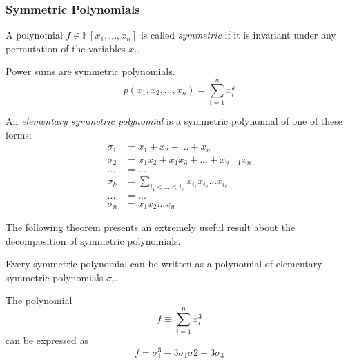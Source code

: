 \documentclass{article}
\begin{document}
    \subsubsection{Symmetric Polynomials}

      \begin{definition}
        A polynomial $f \in \mathbb{F}[x_1, ..., x_n]$ is called \textit{symmetric} if it is invariant under any permutation of the variables $x_i$. 
      \end{definition}

      \begin{example}
        Power sums are symmetric polynomials. 
        \begin{equation}
          p(x_1, x_2, ..., x_n) = \sum_{i=1}^n x_i^k
        \end{equation}
      \end{example}

      \begin{definition}
        An \textit{elementary symmetric polynomial} is a symmetric polynomial of one of these forms: 
        \begin{align*}
          \sigma_1 & = x_1 + x_2 + ... + x_n \\
          \sigma_2 & = x_1 x_2 + x_1 x_3 + ... + x_{n-1} x_n \\
          ... & = ... \\
          \sigma_k & = \sum_{i_1 < ... < i_k} x_{i_1} x_{i_2} ... x_{i_k} \\
          ... & = ... \\
          \sigma_n & = x_1 x_2 ... x_n
        \end{align*}
      \end{definition}

      The following theorem presents an extremely useful result about the decomposition of symmetric polynomials. 

      \begin{theorem}
        Every symmetric polynomial can be written as a polynomial of elementary symmetric polynomials $\sigma_i$. 
      \end{theorem}

      \begin{example}
        The polynomial 
        \begin{equation}
          f \equiv \sum_{i=1}^n x_i^3
        \end{equation}
        can be expressed as 
        \begin{equation}
          f = \sigma_1^3 - 3 \sigma_1 \sigma 2 + 3 \sigma_3
        \end{equation}
      \end{example}
\end{document}
